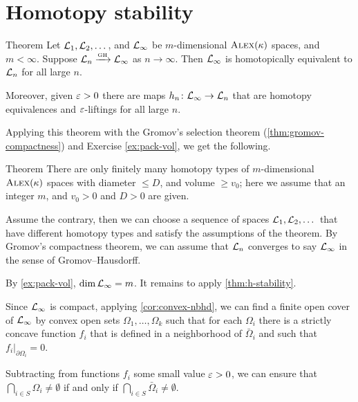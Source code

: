 

\section{Homotopy stability}

\begin{thm}{Theorem}\label{thm:h-stability}
Let $\mathcal{L}_1,\mathcal{L}_2,\dots$, and $\mathcal{L}_\infty$ be $m$-dimensional $\textsc{Alex}(\kappa)$ spaces, and $m<\infty$.
Suppose $\spc{L}_n\z\GHto \spc{L}_\infty$ as $n\to \infty$.
Then $\mathcal{L}_\infty$ is homotopically equivalent to $\mathcal{L}_n$ for all large $n$.

Moreover, given $\varepsilon>0$ there are maps $h_n\colon\mathcal{L}_\infty\to \mathcal{L}_n$ that are homotopy equivalences and $\varepsilon$-liftings for all large $n$.
\end{thm}

Applying this theorem with the Gromov's selection theorem (\ref{thm:gromov-compactness}) and Exercise \ref{ex:pack-vol}, we get the following.


\begin{thm}{Theorem}\label{thm:h-finiteness}
There are only finitely many homotopy types of $m$-dimensional $\textsc{Alex}(\kappa)$ spaces with diameter $\le D$, and volume $\ge v_0$;
here we assume that an integer $m$, and $v_0>0$ and $D>0$ are given.
\end{thm}

Assume the contrary, then we can choose a sequence of spaces $\mathcal{L}_1,\mathcal{L}_2,\dots$ that have different homotopy types and satisfy the assumptions of the theorem.
By Gromov's compactness theorem, we can assume that $\mathcal{L}_n$ converges to say $\mathcal{L}_\infty$ in the sense of Gromov--Hausdorff.

By \ref{ex:pack-vol}, $\operatorname{\rm dim}\nolimits \mathcal{L}_\infty=m$.
It remains to apply \ref{thm:h-stability}.
\qeds

Since $\mathcal{L}_\infty$ is compact, applying \ref{cor:convex-nbhd}, we can find a finite open cover of $\mathcal{L}_\infty$ by convex open sets $\Omega_1,\dots, \Omega_k$ such that 
for each $\Omega_i$ there is a strictly concave function $f_i$ that is defined in a neighborhood of $\bar \Omega_i$ and such that $f_i|_{\partial \Omega_i}=0$.

Subtracting from functions $f_i$ some small value $\varepsilon>0$,
we can ensure that $\bigcap_{i\in S}\Omega_{i}\ne \emptyset$ if and only if $\bigcap_{i\in S}\bar\Omega_{i}\ne \emptyset$.

